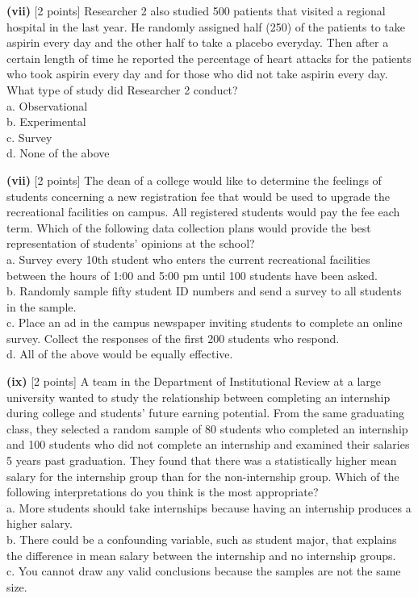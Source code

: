 \documentclass[11pt]{isuthesis}\usepackage[]{graphicx}\usepackage[]{color}
\begin{document}
\begin{appendices}
\noindent\textbf{(vii)} [2 points] Researcher 2 also studied 500 patients that visited a regional hospital in the last year. He randomly assigned half (250) of the patients to take aspirin every day and the other half to take a placebo everyday. Then after a certain length of time he reported the percentage of heart attacks for the patients who took aspirin every day and for those who did not take aspirin every day. What type of study did Researcher 2 conduct? \\ 
\indent a. Observational \\
\indent b. Experimental \\
\indent c. Survey \\
\indent d. None of the above 

\noindent\textbf{(vii)} [2 points] The dean of a college would like to determine the feelings of students concerning a new registration fee that would be used to upgrade the recreational facilities on campus. All registered students would pay the fee each term. Which of the following data collection plans would provide the best representation of students' opinions at the school? \\
\indent a. Survey every 10th student who enters the current recreational facilities between the hours of 1:00 and 5:00 pm until 100 students have been asked. \\
\indent b. Randomly sample fifty student ID numbers and send a survey to all students in the sample. \\
\indent c. Place an ad in the campus newspaper inviting students to complete an online survey. Collect the responses of the first 200 students who respond. \\
\indent d. All of the above would be equally effective. 

\noindent\textbf{(ix)} [2 points] A team in the Department of Institutional Review at a large university wanted to study the relationship between completing an internship during college and students' future earning potential. From the same graduating class, they selected a random sample of 80 students who completed an internship and 100 students who did not complete an internship and examined their salaries 5 years past graduation. They found that there was a statistically higher mean salary for the internship group than for the non-internship group. Which of the following interpretations do you think is the most appropriate?\\
\indent a. More students should take internships because having an internship produces a higher salary.\\
\indent b. There could be a confounding variable, such as student major, that explains the difference in mean salary between the internship and no internship groups. \\
\indent c. You cannot draw any valid conclusions because the samples are not the same size.\\


\end{appendices}
\end{document}
